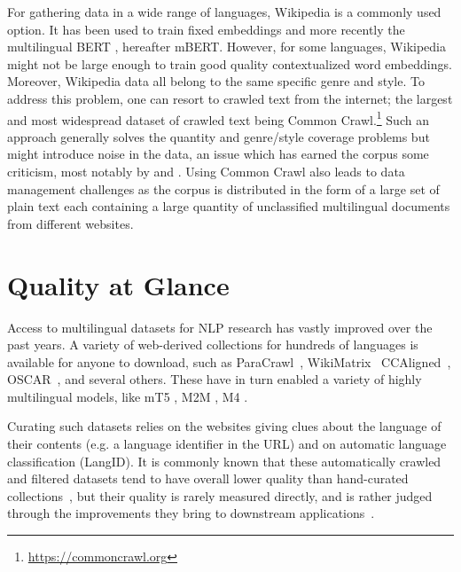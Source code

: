 For gathering data in a wide range of languages, Wikipedia is a commonly used option. It has been used to train fixed embeddings \citep{al-rfou-etal-2013-polyglot,bojanowski-etal-2017-enriching} and more recently the multilingual BERT \citep{devlin-etal-2019-bert}, hereafter mBERT. However, for some languages, Wikipedia might not be large enough to train good quality contextualized word embeddings. Moreover, Wikipedia data all belong to the same specific genre and style. To address this problem, one can resort to crawled text from the internet; the largest and most widespread dataset of crawled text being Common Crawl.\footnote{\url{https://commoncrawl.org}} Such an approach generally solves the quantity and genre/style coverage problems but might introduce noise in the data, an issue which has earned the corpus some criticism, most notably by \citet{trinh-le-2018-a} and \citet{radford-etal-2019-language}. Using Common Crawl also leads to data management challenges as the corpus is distributed in the form of a large set of plain text each containing a large quantity of unclassified multilingual documents from different websites.

\section{Quality at Glance}

Access to multilingual datasets for NLP research has vastly improved over the past years. A variety of web-derived collections for hundreds of languages is available for anyone to download, such as ParaCrawl~\citep{espla-etal-2019-paracrawl, banon-etal-2020-paracrawl}, WikiMatrix~\citep{schwenk-etal-2021-wikimatrix} CCAligned~\citep{el-kishky-etal-2020-ccaligned}, \mbox{OSCAR}~\citep{ortiz-suarez-etal-2019-asynchronous, ortiz-suarez-etal-2020-monolingual}, and several others.
These have in turn enabled a variety of highly multilingual models, like mT5 \citep{xue-etal-2021-mt5}, M2M \citep{fan-etal-2020-beyond}, M4 \citep{arivazhagan-etal-2019-massively}.

Curating such datasets relies on the websites giving clues about the language of their contents (e.g. a language identifier in the URL) and on automatic language classification (LangID).
It is commonly known that these automatically crawled and filtered datasets tend to have overall lower quality than hand-curated collections~\citep{koehn-etal-2020-findings}, but their quality is rarely measured directly, and is rather judged through the improvements they bring to downstream applications~\citep{schwenk-etal-2021-wikimatrix}.

